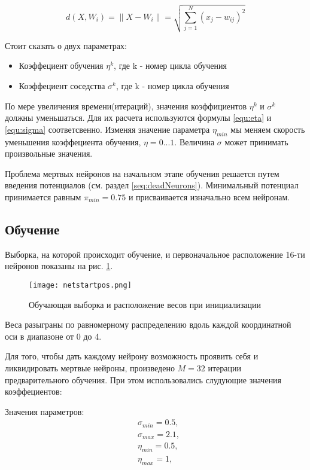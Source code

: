 \begin{equation}\label{equ:euclid}
    d \left( X , W _ { i } \right) = \left\| X - W _ { i } \right\| = \sqrt { \sum _ { j = 1 } ^ { N } \left( x _ { j } - w _ { i j } \right) ^ { 2 } }
\end{equation}

Стоит сказать о двух параметрах:
\begin{itemize}
    \item Коэффециент обучения $\eta^k$, где k - номер цикла обучения
    \item Коэффециент соседства $\sigma^k$, где k - номер цикла обучения
\end{itemize}

По мере увеличения времени(итераций), значения коэффициентов $\eta ^ { k }$ и $\sigma ^ { k }$ должны уменьшаться. Для их расчета используются формулы \eqref{equ:eta} и \eqref{equ:sigma} соответсвенно. Изменяя значение параметра $\eta_{min}$ мы меняем скорость уменьшения коэффециента обучения, $\eta = 0 ... 1$. Величина $\sigma$ может принимать произвольные значения.


Проблема мертвых нейронов на начальном этапе обучения решается путем введения потенциалов (см. раздел \ref{seq:deadNeurons}). 
Минимальный потенциал принимается равным $\pi_{min} = 0.75$ и присваивается изначально всем нейронам.



\subsection{Обучение}
Выборка, на которой происходит обучение, и первоначальное расположение 16-ти нейронов показаны на рис. \ref{img:startpos}.

\begin{figure}[H]
\centering
\texttt{[image: netstartpos.png]}
\caption{Обучающая выборка и расположение весов при инициализации}
\label{img:startpos}
\end{figure}

Веса разыграны по равномерному распределению вдоль каждой координатной оси в диапазоне от 0 до 4.

Для того, чтобы дать каждому нейрону возможность проявить себя и ликвидировать мертвые нейроны, произведено $M = 32$ итерации предварительного обучения. При этом использовались слудующие значения коэффециентов:

Значения параметров:
\begin{equation}
	\begin{aligned}
	 &	\sigma_{min} = 0.5,  \\ 
	 &	\sigma_{max} = 2.1, \\	
	 &	\eta_{min} = 0.5,  \\ 
	 &	\eta_{max} = 1, \\
	\end{aligned}
\end{equation} 


